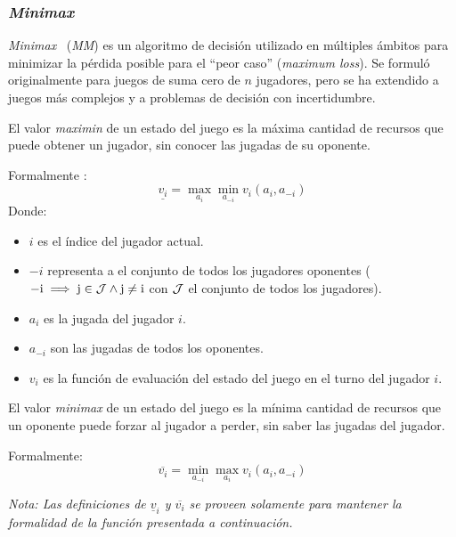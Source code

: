 \subsubsection{\textit{Minimax}}
  \textit{Minimax}~\cite{fanMinimaxTheorems1953} (\textit{MM}) es un 
  algoritmo de decisión utilizado en múltiples ámbitos para minimizar la pérdida posible para 
  el \enquote{peor caso} (\textit{maximum loss}). 
  Se formuló originalmente para juegos de suma cero de \(n\) jugadores, pero se ha extendido a
  juegos más complejos y a problemas de decisión con incertidumbre.

  \begin{definition}
    El valor \textit{maximin} de un estado del juego es la máxima cantidad de recursos que puede 
    obtener un jugador, sin conocer las jugadas de su oponente.

    Formalmente \cite{Minimax2022}:
    \[
      \underline{v_{i}} = \max_{a_{i}}\min_{a_{-i}}v_{i}(a_{i},a_{-i})
    \]
    Donde:
    \begin{itemize}
      \item \(i\) es el índice del jugador actual.
      \item \(-i\) representa a el conjunto de todos los jugadores oponentes (\(-\text{i} \implies 
        \text{j}\in\cal{J} \land \text{j} \neq \text{i}\) con \(\cal{J}\) el conjunto de todos los 
        jugadores).
      \item \(a_i\) es la jugada del jugador \(i\).
      \item \(a_{-i}\) son las jugadas de todos los oponentes.
      \item \(v_i\) es la función de evaluación del estado del juego en el turno del jugador 
        \(i\).
    \end{itemize}
  \end{definition}

  \begin{definition}
    El valor \textit{minimax} de un estado del juego es la mínima cantidad de recursos que un 
    oponente puede forzar al jugador a perder, sin saber las jugadas del jugador.
    
    Formalmente:
    \[
      \overline{v_{i}} = 
        \min_{a_{-i}}\max_{a_{i}}{v_{i}(a_{i}, a_{-i})}
    \]
  \end{definition}

  \textit{Nota: Las definiciones de \(\underline{v}_{i}\) y \(\overline{v_{i}}\) se proveen solamente
  para mantener la formalidad de la función presentada a continuación.}

